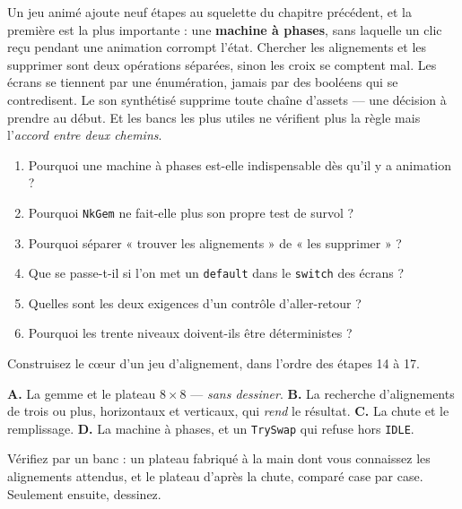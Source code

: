 \begin{nkbilan}
Un jeu animé ajoute neuf étapes au squelette du chapitre précédent, et la
première est la plus importante : une \textbf{machine à phases}, sans laquelle un
clic reçu pendant une animation corrompt l'état. Chercher les alignements et les
supprimer sont deux opérations séparées, sinon les croix se comptent mal. Les
écrans se tiennent par une énumération, jamais par des booléens qui se
contredisent. Le son synthétisé supprime toute chaîne d'assets --- une décision
à prendre au début. Et les bancs les plus utiles ne vérifient plus la règle mais
l'\emph{accord entre deux chemins}.
\end{nkbilan}

\begin{nkquestions}
\begin{enumerate}
\item Pourquoi une machine à phases est-elle indispensable dès qu'il y a
      animation ?
\item Pourquoi \texttt{NkGem} ne fait-elle plus son propre test de survol ?
\item Pourquoi séparer « trouver les alignements » de « les supprimer » ?
\item Que se passe-t-il si l'on met un \texttt{default} dans le \texttt{switch}
      des écrans ?
\item Quelles sont les deux exigences d'un contrôle d'aller-retour ?
\item Pourquoi les trente niveaux doivent-ils être déterministes ?
\end{enumerate}
\end{nkquestions}

\begin{nkpratique}
Construisez le c\oe ur d'un jeu d'alignement, dans l'ordre des étapes 14 à 17.

\textbf{A.} La gemme et le plateau $8\times8$ --- \emph{sans dessiner}.
\textbf{B.} La recherche d'alignements de trois ou plus, horizontaux et
verticaux, qui \emph{rend} le résultat.
\textbf{C.} La chute et le remplissage.
\textbf{D.} La machine à phases, et un \texttt{TrySwap} qui refuse hors
\texttt{IDLE}.

Vérifiez par un banc : un plateau fabriqué à la main dont vous connaissez les
alignements attendus, et le plateau d'après la chute, comparé case par case.
Seulement ensuite, dessinez.
\end{nkpratique}

